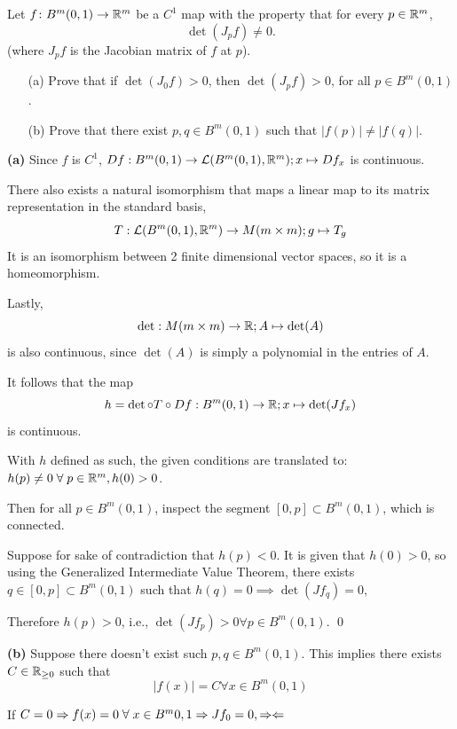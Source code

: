 \documentclass[a4paper, 12pt]{article}
\begin{document}
\begin{problem} 
Let $f\colon B^m(0,1)\to \mathbb{R}^m$ be a $C^1$ map with the property that for every $p\in \mathbb{R}^m$,
\[\det(J_p f)\neq 0.
\]
(where $J_p f$ is the Jacobian matrix of $f$ at $p$).
\begin{enumerate}
    \item[(a)] Prove that if $\det(J_0f) > 0$, then  $\det(J_p f)> 0$, for all $p\in  B^m(0,1)$.
    \item[(b)] Prove that there exist $p,q\in  B^m(0,1)$ such that $|f(p)|\neq |f(q)|$.
\end{enumerate}
\end{problem}
\begin{solution}
    \textbf{(a)} Since $f$ is $C^1$, $Df: B^m(0, 1) \to \mathcal{L}(B^m(0, 1), \mathbb{R}^m); x \mapsto Df_x$ is continuous.

    There also exists a natural isomorphism that maps a linear map to its matrix representation in the standard basis, \[
        T: \mathcal{L}(B^m(0, 1), \mathbb{R}^m) \to M(m \times m); g \mapsto T_g
    \]
    It is an isomorphism between 2 finite dimensional vector spaces, so it is a homeomorphism.

    Lastly, \[
        \det: M(m \times m) \to \mathbb{R}; A \mapsto \det(A)
    \]
    is also continuous, since $\det (A)$ is simply a polynomial in the entries of $A$.

    It follows that the map \[
        h = \det \circ T \circ Df: B^m(0, 1) \to \mathbb{R}; x \mapsto \det(Jf_x)
    \]
    is continuous.

    With $h$ defined as such, the given conditions are translated to: $h(p) \neq 0 \forall p \in \bbr^m, h(0) > 0$.

    Then for all $p \in B^m(0, 1)$, inspect the segment $[0, p] \subset B^m(0, 1)$, which is connected.

    Suppose for sake of contradiction that $h(p) < 0$. It is given that $h(0) > 0$, so using the Generalized Intermediate Value Theorem, there exists $q \in [0, p] \subset B^m(0, 1)$ such that $h(q) = 0 \implies \det(Jf_q) = 0$, \contra

    Therefore $h(p) > 0$, i.e., $ \det(Jf_p) > 0 \forall p \in B^m(0, 1)$. \qed

    \textbf{(b)} Suppose there doesn't exist such $p, q \in B^m(0, 1)$. This implies there exists $C \in \mathbb{R}_{\geq 0}$ such that \[
        |f(x)| = C \forall x \in B^m(0, 1)
    \]

    If $C = 0 \implies f(x) = 0 \forall x \in B^m{0, 1} \implies Jf_0 = 0, \contra$


\end{solution}
\end{document}
